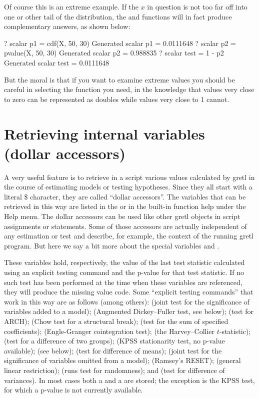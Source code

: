 Of course this is an extreme example.  If the $x$ in question is not
too far off into one or other tail of the distribution, the 
and  functions will in fact produce complementary
answers, as shown below:
\begin{code}
? scalar p1 = cdf(X, 50, 30)
Generated scalar p1 = 0.0111648
? scalar p2 = pvalue(X, 50, 30)
Generated scalar p2 = 0.988835
? scalar test = 1 - p2
Generated scalar test = 0.0111648
\end{code}
But the moral is that if you want to examine extreme values
you should be careful in selecting the function you need, in the
knowledge that values very close to zero can be represented as doubles
while values very close to 1 cannot.


\section{Retrieving internal variables (dollar accessors)}
\label{sec:genr-internal}

A very useful feature is to retrieve in a script various values
calculated by gretl in the course of estimating models or testing
hypotheses. Since they all start with a literal \$ character, they
are called ``dollar accessors''. The variables that can be retrieved
in this way are listed in the \GCR or in the built-in function help
under the Help menu. The dollar accessors can be used like other
gretl objects in script assignments or statements. Some of those
accessors are actually independent of any estimation or test and
describe, for example, the context of the running gretl program. 
But here we say a bit more about the special variables
 and .

These variables hold, respectively, the value of the last test
statistic calculated using an explicit testing command and the p-value
for that test statistic.  If no such test has been performed at the
time when these variables are referenced, they will produce the
missing value code.  Some ``explicit testing commands'' that work in
this way are as follows (among others):  (joint test for the
significance of variables added to a model);  (Augmented
Dickey--Fuller test, see below);  (test for ARCH);
 (Chow test for a structural break);  (test
for the sum of specified coefficients);  (Engle-Granger
cointegration test);  (the Harvey--Collier $t$-statistic);
 (test for a difference of two groups);  (KPSS
stationarity test, no p-value available);  (see below);
 (test for difference of means);  (joint test
for the significance of variables omitted from a model); 
(Ramsey's RESET);  (general linear restriction);
 (runs test for randomness); and  (test for
difference of variances). In most cases both a  and a
 are stored; the exception is the KPSS test, for which
a p-value is not currently available.

